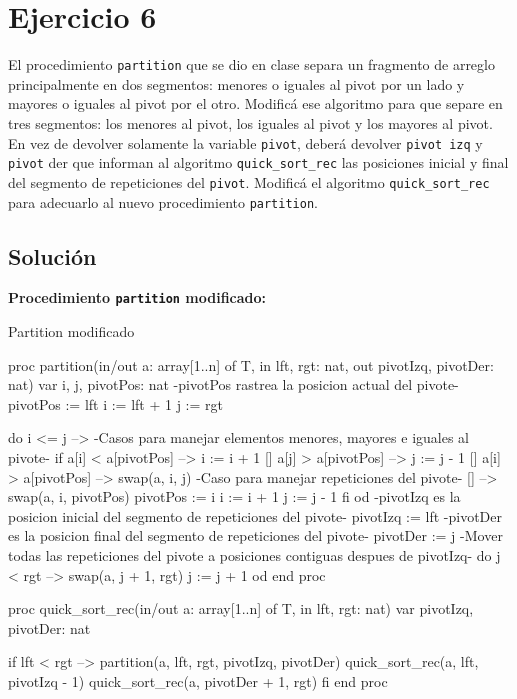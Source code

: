 \section{Ejercicio 6}
El procedimiento \texttt{partition} que se dio en clase separa un fragmento de arreglo principalmente en dos segmentos: menores o iguales al pivot por un lado y mayores o iguales al pivot por el otro. Modificá ese algoritmo para que separe en tres segmentos: los menores al pivot, los iguales al pivot y los mayores al pivot. En vez de devolver solamente la variable \texttt{pivot}, deberá devolver \texttt{pivot izq} y \texttt{pivot} der que informan al algoritmo \texttt{quick\_sort\_rec} las posiciones inicial y final del segmento de repeticiones del \texttt{pivot}. Modificá el algoritmo \texttt{quick\_sort\_rec} para adecuarlo al nuevo procedimiento \texttt{partition}.

\subsection{Solución}

\textbf{Procedimiento \texttt{partition} modificado:}

\begin{codebox}{Partition modificado}
\begin{pascallike}
proc partition(in/out a: array[1..n] of T, in lft, rgt: nat, 
out pivotIzq, pivotDer: nat)
    var i, j, pivotPos: nat
    {-pivotPos rastrea la posicion actual del pivote-}
    pivotPos := lft
    i := lft + 1
    j := rgt

    do i <= j -->
        {-Casos para manejar elementos menores, mayores e iguales al pivote-}
        if a[i] < a[pivotPos] -->
            i := i + 1
        [] a[j] > a[pivotPos] -->
            j := j - 1
        [] a[i] > a[pivotPos] -->
            swap(a, i, j)
        {-Caso para manejar repeticiones del pivote-}
        [] -->
            swap(a, i, pivotPos)
            pivotPos := i
            i := i + 1
            j := j - 1
        fi
    od
    {-pivotIzq es la posicion inicial del segmento de repeticiones del pivote-}
    pivotIzq := lft
    {-pivotDer es la posicion final del segmento de repeticiones del pivote-}
    pivotDer := j
    {-Mover todas las repeticiones del pivote a posiciones contiguas despues de pivotIzq-}
    do j < rgt -->
        swap(a, j + 1, rgt)
        j := j + 1
    od
end proc

proc quick_sort_rec(in/out a: array[1..n] of T, in lft, rgt: nat)
    var pivotIzq, pivotDer: nat

    if lft < rgt -->
        partition(a, lft, rgt, pivotIzq, pivotDer)
        quick_sort_rec(a, lft, pivotIzq - 1)
        quick_sort_rec(a, pivotDer + 1, rgt)
    fi
end proc
\end{pascallike}
\end{codebox}